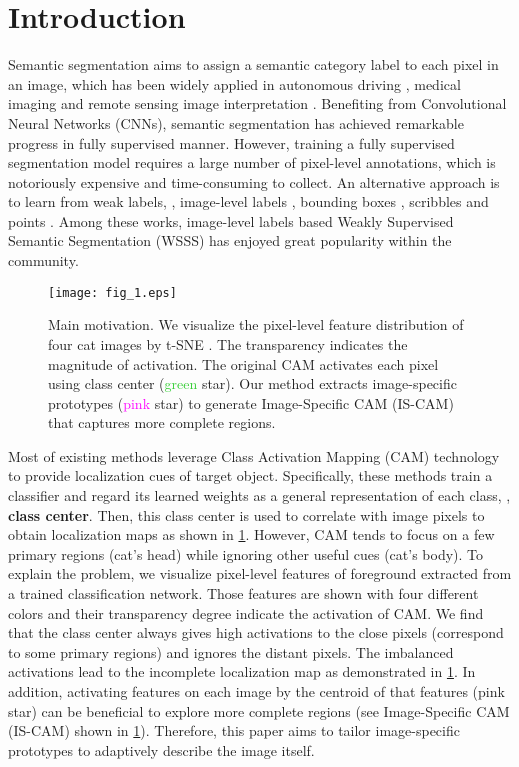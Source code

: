 \documentclass[10pt,twocolumn,letterpaper]{article}
\begin{document}
\section{Introduction}
\label{sec:intro}

Semantic segmentation aims to assign a semantic category label to each pixel in an image, which has been widely applied in autonomous driving \cite{feng2020deep}, medical imaging \cite{tajbakhsh2020embracing} and remote sensing image interpretation \cite{hossain2019segmentation}.
Benefiting from Convolutional Neural Networks (CNNs), semantic segmentation has achieved remarkable progress in fully supervised manner.
However, training a fully supervised segmentation model requires a large number of pixel-level annotations, which is notoriously expensive and time-consuming to collect.
An alternative approach is to learn from weak labels, \eg, image-level labels \cite{ahn2018learning}, bounding boxes \cite{lee2021bbam,zhang2021affinity}, scribbles \cite{lin2016scribblesup,Pan2021Scribble,Xu2021Scribble} and points \cite{bearman2016s,Chen2021Seminar}.
Among these works, image-level labels based Weakly Supervised Semantic Segmentation (WSSS) has enjoyed great popularity within the community.


\begin{figure}[t]
    \centering
    \texttt{[image: fig\_1.eps]}
    \caption{Main motivation. We visualize the pixel-level feature distribution of four cat images by t-SNE \cite{van2008visualizing}. The transparency indicates the magnitude of activation. The original CAM activates each pixel using class center (\textcolor{LimeGreen}{green} star). Our method extracts image-specific prototypes (\textcolor{magenta}{pink} star) to generate Image-Specific CAM (IS-CAM) that captures more complete regions.}
    \label{fig:fig1}
\end{figure}


Most of existing methods leverage Class Activation Mapping (CAM) \cite{Zhou_2016_CVPR} technology to provide localization cues of target object.
Specifically, these methods train a classifier and regard its learned weights as a general representation of each class, \ie, \textbf{class center}.
Then, this class center is used to correlate with image pixels to obtain localization maps as shown in \cref{fig:fig1}.
However, CAM tends to focus on a few primary regions (cat's head) while ignoring other useful cues (cat's body).
To explain the problem, we visualize pixel-level features of foreground extracted from a trained classification network.
Those features are shown with four different colors and their transparency degree indicate the activation of CAM.
We find that the class center always gives high activations to the close pixels (correspond to some primary regions) and ignores the distant pixels.
The imbalanced activations lead to the incomplete localization map as demonstrated in \cref{fig:fig1}.
In addition, activating features on each image by the centroid of that features (pink star) can be beneficial to explore more complete regions (see Image-Specific CAM (IS-CAM) shown in \cref{fig:fig1}).
Therefore, this paper aims to tailor image-specific prototypes to adaptively describe the image itself.
\end{document}

